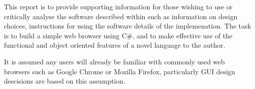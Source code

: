 \documentclass[../Main.tex]{subfiles}
\begin{document}
This report is to provide supporting information for those wishing to use or critically analyse the software described within such as information on design choices, instructions for using the software details of the implemenation.
The task is to build a simple web browser using C\#, and to make effective use of the functional and object oriented features of a novel language to the author.

It is assumed any users will already be familiar with commonly used web browsers such as Google Chrome or Mozilla Firefox, particularly GUI design descisions are based on this assumption. 
\end{document}
